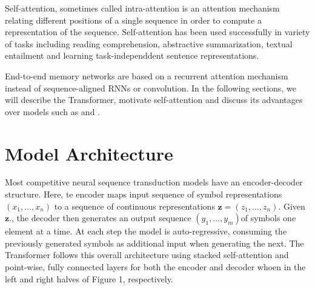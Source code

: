 \documentclass{article}
\begin{document}
Self-attention, sometimes called intra-attention is an attention mechanism relating different positions of a single sequence in order to compute a representation of the sequence.
Self-attention has been used successfully in variety of tasks including reading comprehension, abstractive summarization, textual entailment and learning task-independdent sentence representations\cite{4,27,28,22}.

End-to-end memory networks are based on a recurrent attention mechanism instead of sequence-aligned RNNs or convolution.
In the following sections, we will describe the Transformer, motivate self-attention and discuss its advantages over models such as \cite{17,18} and \cite{9}.

\section{Model Architecture}
Most competitive neural sequence transduction models have an encoder-decoder structure\cite{5,2,35}.
Here, te encoder maps input sequence of symbol representations $\left(x_1,\dots,x_n\right)$  to a sequence of continuous representations $\mathbf{z}=\left(z_1,\dots,z_n\right)$.
Given $\mathbf{z}$., the decoder then generates an output sequence $\left(y_1,\dots,y_m\right)$of symbols one element at a time.
At each step the model is auto-regressive\cite{10}, consuming the previously generated symbols as additional input when generating the next.
The Transformer follows this overall architecture using stacked self-attention and point-wise, fully connected layers for both the encoder and decoder whoen in the left and right halves of Figure 1, respectively.
\end{document}
